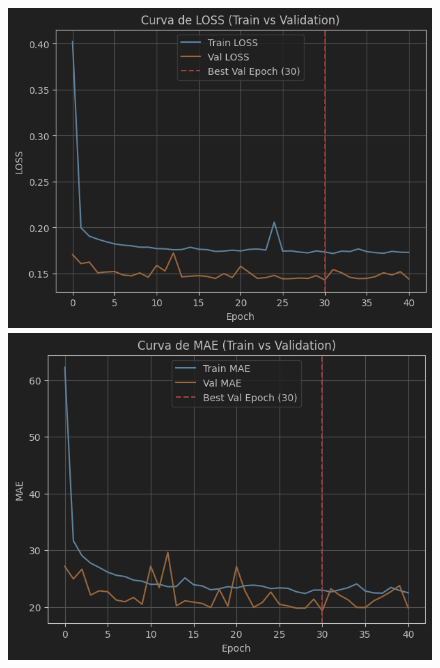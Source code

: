 \begin{figure}[H]
	\centering
	\begin{minipage}{0.48\textwidth}
		\centering
		\includegraphics[width=\linewidth]{includes/cap5/graphs/sid1_trafficformer_loss.png}
		\vspace{0.2cm}
		\includegraphics[width=\linewidth]{includes/cap5/graphs/sid1_trafficformer_mae.png}
		\vspace{0.2cm}

\end{minipage}
\end{figure}
